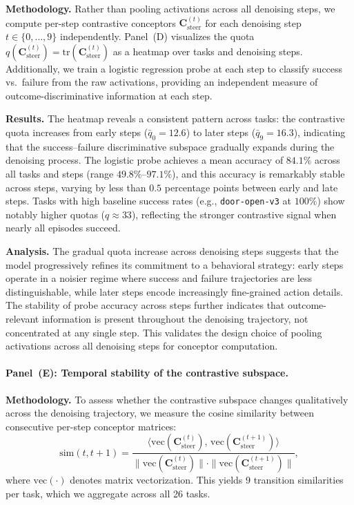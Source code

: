 \textbf{Methodology.}
Rather than pooling activations across all denoising steps, we compute per-step contrastive conceptors $\mathbf{C}^{(t)}_{\mathrm{steer}}$ for each denoising step $t \in \{0, \ldots, 9\}$ independently. Panel~(D) visualizes the quota $q(\mathbf{C}^{(t)}_{\mathrm{steer}}) = \mathrm{tr}(\mathbf{C}^{(t)}_{\mathrm{steer}})$ as a heatmap over tasks and denoising steps. Additionally, we train a logistic regression probe at each step to classify success vs.\ failure from the raw activations, providing an independent measure of outcome-discriminative information at each step.

\textbf{Results.}
The heatmap reveals a consistent pattern across tasks: the contrastive quota increases from early steps ($\bar{q}_0 = 12.6$) to later steps ($\bar{q}_9 = 16.3$), indicating that the success--failure discriminative subspace gradually expands during the denoising process. The logistic probe achieves a mean accuracy of $84.1\%$ across all tasks and steps (range $49.8\%$--$97.1\%$), and this accuracy is remarkably stable across steps, varying by less than $0.5$ percentage points between early and late steps. Tasks with high baseline success rates (e.g., \texttt{door-open-v3} at $100\%$) show notably higher quotas ($q \approx 33$), reflecting the stronger contrastive signal when nearly all episodes succeed.

\textbf{Analysis.}
The gradual quota increase across denoising steps suggests that the model progressively refines its commitment to a behavioral strategy: early steps operate in a noisier regime where success and failure trajectories are less distinguishable, while later steps encode increasingly fine-grained action details. The stability of probe accuracy across steps further indicates that outcome-relevant information is present throughout the denoising trajectory, not concentrated at any single step. This validates the design choice of pooling activations across all denoising steps for conceptor computation.

\paragraph{Panel~(E): Temporal stability of the contrastive subspace.}

\textbf{Methodology.}
To assess whether the contrastive subspace changes qualitatively across the denoising trajectory, we measure the cosine similarity between consecutive per-step conceptor matrices:
\begin{equation}
    \mathrm{sim}(t, t{+}1) = \frac{\langle \mathrm{vec}(\mathbf{C}^{(t)}_{\mathrm{steer}}),\, \mathrm{vec}(\mathbf{C}^{(t+1)}_{\mathrm{steer}}) \rangle}{\|\mathrm{vec}(\mathbf{C}^{(t)}_{\mathrm{steer}})\| \cdot \|\mathrm{vec}(\mathbf{C}^{(t+1)}_{\mathrm{steer}})\|},
\end{equation}
where $\mathrm{vec}(\cdot)$ denotes matrix vectorization. This yields 9 transition similarities per task, which we aggregate across all 26 tasks.

